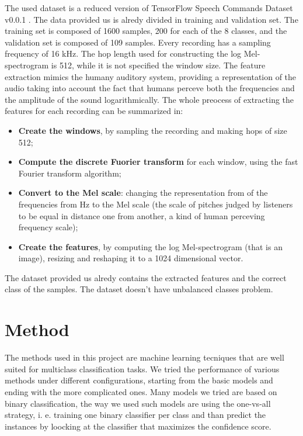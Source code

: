 \documentclass[10pt,twocolumn,letterpaper]{article}
\begin{document}
The used dataset is a reduced version of TensorFlow Speech Commands Dataset v0.0.1 \cite{tensorflow2015-whitepaper}. The data provided us is alredy divided in training and validation set. The training set is composed of 1600 samples, 200 for each of the 8 classes, and the validation set is composed of 109 samples.
Every recording has a sampling frequency of 16 kHz. The hop length used for constructing the log Mel-spectrogram is 512, while it is not specified the window size. The feature extraction mimics the humany auditory system, providing a representation of the audio taking into account the fact that humans perceve both the frequencies and the amplitude of the sound logarithmically. The whole preocess of extracting the features for each recording can be summarized in:
\begin{itemize}
	\item \textbf{Create the windows}, by sampling the recording and making hops of size 512;
	\item \textbf{Compute the discrete Fuorier transform} for each window, using the fast Fourier transform algorithm;
	\item \textbf{Convert to the Mel scale}: changing the representation from of the frequencies from Hz to the Mel scale (the scale of pitches judged by listeners to be equal in distance one from another, a kind of human perceving frequency scale);
	\item \textbf{Create the features}, by computing the log Mel-spectrogram (that is an image), resizing and reshaping it to a 1024 dimensional vector.
\end{itemize}
The dataset provided us alredy contains the extracted features and the correct class of the samples. The dataset doesn't have unbalanced classes problem.

\section{Method}
The methods used in this project are machine learning tecniques that are well suited for multiclass classification tasks. We tried the performance of various methods under different configurations, starting from the basic models and ending with the more complicated ones. Many models we tried are based on binary classification, the way we used such models are using the one-vs-all strategy, i. e. training one binary classifier per class and than predict the instances by loocking at the classifier that maximizes the confidence score.
\end{document}
